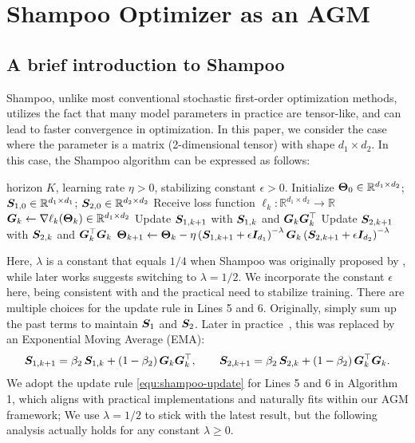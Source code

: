 \section{Shampoo Optimizer as an AGM}\label{app:shampoo}

\subsection{A brief introduction to Shampoo}

Shampoo, unlike most conventional stochastic first-order optimization methods, utilizes the fact that many model parameters in practice are tensor-like, and can lead to faster convergence in optimization. In this paper, we consider the case where the parameter is a matrix (2-dimensional tensor) with shape $d_1 \times d_2$. In this case, the Shampoo algorithm can be expressed as follows: 
\begin{algorithm}[H]
\caption{Shampoo with matrix-like parameters}
\begin{algorithmic}[1]
\Require horizon $K$, learning rate $\eta>0$, stabilizing constant $\epsilon > 0$.
\State Initialize ${\bm{\Theta}}_0 \in \mathbb{R}^{d_1\times d_2}$; ${\bm{S}}_{1,0} \in \mathbb{R}^{d_1 \times d_1}$; ${\bm{S}}_{2,0} \in \mathbb{R}^{d_2 \times d_2}$
  \State Receive loss function $\ell_k:\mathbb{R}^{d_1\times d_2}\to\mathbb{R}$
  \State ${\bm{G}}_k \gets \nabla \ell_k({\bm{\Theta}}_k)\in\mathbb{R}^{d_1 \times d_2}$ 
  \State Update ${\bm{S}}_{1,k+1}$ with ${\bm{S}}_{1,k}$ and ${\bm{G}}_k {\bm{G}}_k^\top$
  \State Update ${\bm{S}}_{2,k+1}$ with ${\bm{S}}_{2,k}$ and ${\bm{G}}_k^\top {\bm{G}}_k$
  \State ${\bm{\Theta}}_{k+1} \gets {\bm{\Theta}}_k - \eta \left({\bm{S}}_{1,k+1}+\epsilon {\bm{I}}_{d_1}\right)^{-\lambda}{\bm{G}}_k\left({\bm{S}}_{2,k+1}+\epsilon{\bm{I}}_{d_2}\right)^{-\lambda}$
\EndFor
\end{algorithmic}
\end{algorithm}
Here, $\lambda$ is a constant that equals $1/4$ when Shampoo was originally proposed by \citet{gupta2018shampoo}, while later works
\citep{anil2020scalable,shi2023distributed,morwani2024new} suggests switching to $\lambda = 1/2$. We incorporate the constant $\epsilon$ here, being consistent with \citet{gupta2018shampoo} and the practical need to stabilize training. There are multiple choices for the update rule in Lines 5 and 6. Originally, \citet{gupta2018shampoo} simply sum up the past terms to maintain ${\bm{S}}_1$ and ${\bm{S}}_2$. Later in practice~\citep{morwani2024new,lin2025understanding}, this was replaced by an Exponential Moving Average (EMA):
\begin{align}
    {\bm{S}}_{1,k+1}=\beta_2\,{\bm{S}}_{1,k}+(1-\beta_2)\,{\bm{G}}_k{\bm{G}}_k^\top,\qquad
{\bm{S}}_{2,k+1}=\beta_2\,{\bm{S}}_{2,k}+(1-\beta_2)\,{\bm{G}}_{k}^\top{\bm{G}}_k.\label{equ:shampoo-update}
\end{align}
We adopt the update rule \eqref{equ:shampoo-update} for Lines 5 and 6 in Algorithm 1, which aligns with practical implementations and naturally fits within our AGM framework; We use $\lambda = 1/2$ to stick with the latest result, but the following analysis actually holds for any constant $\lambda \geq 0$. 


